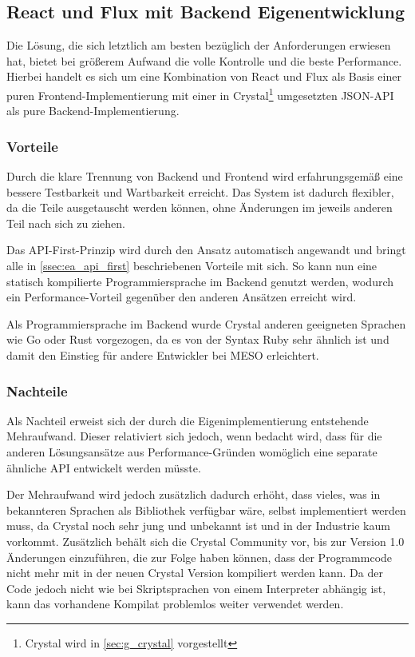 \subsection{React und Flux mit Backend Eigenentwicklung}
\label{ssec:el_react_und_flux_mit_backend_eigenentwicklung}

Die Lösung, die sich letztlich am besten bezüglich der Anforderungen erwiesen
hat, bietet bei größerem Aufwand die volle Kontrolle und die beste Performance.
Hierbei handelt es sich um eine Kombination von React und Flux als Basis einer
puren Frontend-Implementierung mit einer in Crystal\footnote{Crystal wird in
\cref{sec:g_crystal} vorgestellt} umgesetzten JSON-API als pure
Backend-Implementierung.

\subsubsection{Vorteile}
\label{sssec:ele_vorteile}

Durch die klare Trennung von Backend und Frontend wird erfahrungsgemäß eine
bessere Testbarkeit und Wartbarkeit erreicht.  Das System ist dadurch flexibler,
da die Teile ausgetauscht werden können, ohne Änderungen im jeweils anderen Teil
nach sich zu ziehen.

Das API-First-Prinzip wird durch den Ansatz automatisch angewandt und bringt
alle in \cref{ssec:ea_api_first} beschriebenen Vorteile mit sich.  So kann nun
eine statisch kompilierte Programmiersprache im Backend genutzt werden, wodurch
ein Performance-Vorteil gegenüber den anderen Ansätzen erreicht wird.

Als Programmiersprache im Backend wurde Crystal anderen geeigneten Sprachen wie
Go oder Rust vorgezogen, da es von der Syntax Ruby sehr ähnlich ist und damit
den Einstieg für andere Entwickler bei MESO erleichtert.

\subsubsection{Nachteile}
\label{sssec:ele_nachteile}

Als Nachteil erweist sich der durch die Eigenimplementierung entstehende
Mehraufwand.  Dieser relativiert sich jedoch, wenn bedacht wird, dass für die
anderen Lösungsansätze aus Performance-Gründen womöglich eine separate ähnliche
API entwickelt werden müsste.

Der Mehraufwand wird jedoch zusätzlich dadurch erhöht, dass vieles, was in
bekannteren Sprachen als Bibliothek verfügbar wäre, selbst implementiert werden
muss, da Crystal noch sehr jung und unbekannt ist und in der Industrie kaum
vorkommt.  Zusätzlich behält sich die Crystal Community vor, bis zur Version 1.0
Änderungen einzuführen, die zur Folge haben können, dass der Programmcode nicht
mehr mit in der neuen Crystal Version kompiliert werden kann.  Da der Code
jedoch nicht wie bei Skriptsprachen von einem Interpreter abhängig ist, kann das
vorhandene Kompilat problemlos weiter verwendet werden.
